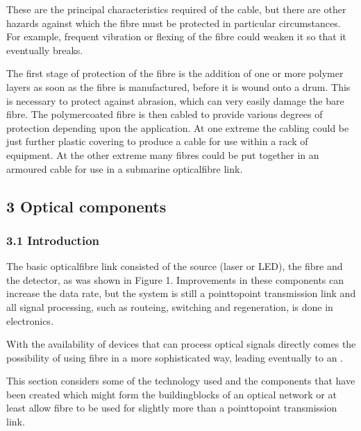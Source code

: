 \documentclass[letterpaper,10pt,english]{sphinxmanual}
\begin{document}
These are the principal characteristics required of the cable, but there are other hazards against which the fibre must be protected in particular circumstances. For example, frequent vibration or flexing of the fibre could weaken it so that it eventually breaks.

The first stage of protection of the fibre is the addition of one or more polymer layers as soon as the fibre is manufactured, before it is wound onto a drum. This is necessary to protect against abrasion, which can very easily damage the bare fibre. The polymer\sphinxhyphen{}coated fibre is then cabled to provide various degrees of protection depending upon the application. At one extreme the cabling could be just further plastic covering to produce a cable for use within a rack of equipment. At the other
extreme many fibres could be put together in an armoured cable for use in a submarine optical\sphinxhyphen{}fibre link.


\subsection{3 Optical components}
\label{\detokenize{content/session_00/Part_00_03:3-Optical-components}}\label{\detokenize{content/session_00/Part_00_03::doc}}

\subsubsection{3.1 Introduction}
\label{\detokenize{content/session_00/Part_00_03:3.1-Introduction}}
The basic optical\sphinxhyphen{}fibre link consisted of the source (laser or LED), the fibre and the detector, as was shown in Figure 1. Improvements in these components can increase the data rate, but the system is still a point\sphinxhyphen{}to\sphinxhyphen{}point transmission link and all signal processing, such as routeing, switching and regeneration, is done in electronics.

With the availability of devices that can process optical signals directly comes the possibility of using fibre in a more sophisticated way, leading eventually to an .

This section considers some of the technology used and the components that have been created which might form the building\sphinxhyphen{}blocks of an optical network \textendash{} or at least allow fibre to be used for slightly more than a point\sphinxhyphen{}to\sphinxhyphen{}point transmission link.
\end{document}
